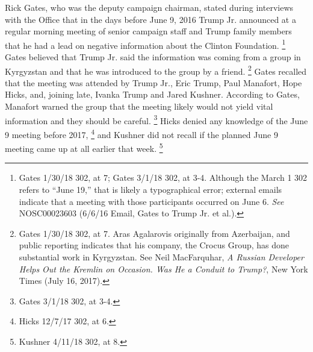 Rick Gates, who was the deputy campaign chairman, stated during interviews with the Office that in the days before June 9, 2016 Trump Jr. announced at a regular morning meeting of senior campaign staff and Trump family members that he had a lead on negative information about the Clinton Foundation.%
\footnote{Gates 1/30/18 302, at 7;
Gates 3/1/18 302, at 3-4.
Although the March 1 302 refers to “June 19,” that is likely a typographical error;
external emails indicate that a meeting with those participants occurred on June 6.
\textit{See} NOSC00023603 (6/6/16 Email, Gates to Trump Jr. et al.).}
Gates believed that Trump Jr. said the information was coming from a group in Kyrgyzstan and that he was introduced to the group by a friend.%
\footnote{Gates 1/30/18 302, at 7.
Aras Agalarovis originally from Azerbaijan, and public reporting indicates that his company, the Crocus Group, has done substantial work in Kyrgyzstan.
See Neil MacFarquhar, \textit{A Russian Developer Helps Out the Kremlin on Occasion. Was He a Conduit to Trump?}, New York Times (July 16, 2017).}
Gates recalled that the meeting was attended by Trump Jr., Eric Trump, Paul Manafort, Hope Hicks, and, joining late, Ivanka Trump and Jared Kushner.
According to Gates, Manafort warned the group that the meeting likely would not yield vital information and they should be careful.%
\footnote{Gates 3/1/18 302, at 3-4.}
Hicks denied any knowledge of the June 9 meeting before 2017,%
\footnote{Hicks 12/7/17 302, at 6.}
and Kushner did not recall if the planned June 9 meeting came up at all earlier that week.%
\footnote{Kushner 4/11/18 302, at 8.}


